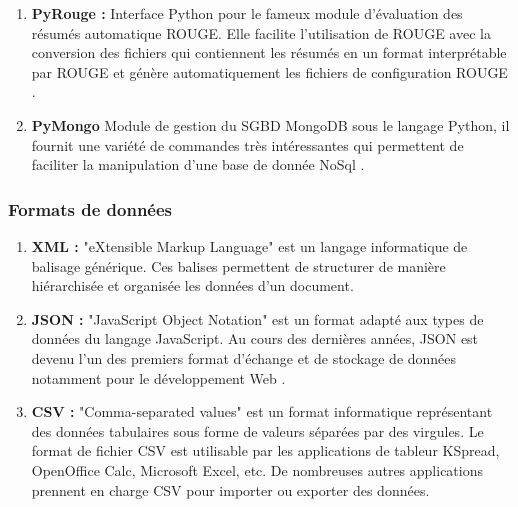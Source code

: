 \begin{enumerate}
                \item{\textbf{PyRouge : }}
                Interface Python pour le fameux module d'évaluation des résumés automatique ROUGE. Elle facilite l'utilisation de ROUGE avec la conversion des fichiers qui contiennent les résumés en un format interprétable par ROUGE et génère automatiquement les fichiers de configuration ROUGE \cite{pyrouge}.\\

                \item{\textbf{PyMongo}}
                Module de gestion du SGBD MongoDB sous le langage Python, il fournit une variété de commandes très intéressantes qui permettent de faciliter la manipulation d'une base de donnée NoSql \cite{pymongo}.\\
            \end{enumerate}

        \subsubsection{Formats de données}
            \begin{enumerate}
                \item{\textbf{XML : }}
                "eXtensible Markup Language" est un langage informatique de balisage générique. Ces balises permettent de structurer de manière hiérarchisée et organisée les données d'un document.\\

                \item{\textbf{JSON : }}
                "JavaScript Object Notation" est un format adapté aux types de données du langage JavaScript. Au cours des dernières années, JSON est devenu l'un des premiers format d'échange et de stockage de données notamment pour le développement Web \cite{jsonimpl}.\\
                
                \item{\textbf{CSV : }}
                "Comma-separated values" est un format informatique représentant des données tabulaires sous forme de valeurs séparées par des virgules. Le format de fichier CSV est utilisable par les applications de tableur KSpread, OpenOffice Calc, Microsoft Excel, etc. De nombreuses autres applications prennent en charge CSV pour importer ou exporter des données.\cite{csv}
            \end{enumerate}

